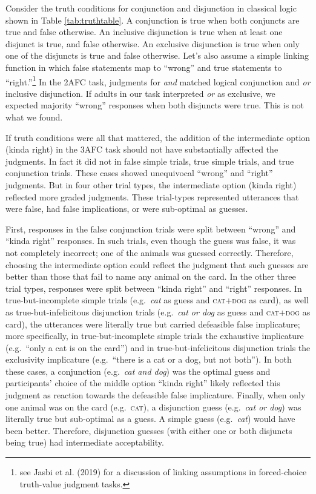 \documentclass[
  english,
  ,man,floatsintext]{apa6}
\begin{document}
Consider the truth conditions for conjunction and disjunction in classical logic shown in Table \ref{tab:truthtable}. A conjunction is true when both conjuncts are true and false otherwise. An inclusive disjunction is true when at least one disjunct is true, and false otherwise. An exclusive disjunction is true when only one of the disjuncts is true and false otherwise. Let's also assume a simple linking function in which false statements map to \enquote{wrong} and true statements to \enquote{right.}\footnote{see Jasbi et al. (2019) for a discussion of linking assumptions in forced-choice truth-value judgment tasks.} In the 2AFC task, judgments for \emph{and} matched logical conjunction and \emph{or} inclusive disjunction. If adults in our task interpreted \emph{or} as exclusive, we expected majority \enquote{wrong} responses when both disjuncts were true. This is not what we found.

If truth conditions were all that mattered, the addition of the intermediate option (kinda right) in the 3AFC task should not have substantially affected the judgments. In fact it did not in false simple trials, true simple trials, and true conjunction trials. These cases showed unequivocal \enquote{wrong} and \enquote{right} judgments. But in four other trial types, the intermediate option (kinda right) reflected more graded judgments. These trial-types represented utterances that were false, had false implications, or were sub-optimal as guesses.

First, responses in the false conjunction trials were split between \enquote{wrong} and \enquote{kinda right} responses. In such trials, even though the guess was false, it was not completely incorrect; one of the animals was guessed correctly. Therefore, choosing the intermediate option could reflect the judgment that such guesses are better than those that fail to name any animal on the card. In the other three trial types, responses were split between \enquote{kinda right} and \enquote{right} responses. In true-but-incomplete simple trials (e.g.~\emph{cat} as guess and \textsc{cat+dog} as card), as well as true-but-infelicitous disjunction trials (e.g.~\emph{cat or dog} as guess and \textsc{cat+dog} as card), the utterances were literally true but carried defeasible false implicature; more specifically, in true-but-incomplete simple trials the exhaustive implicature (e.g.~\enquote{only a cat is on the card}) and in true-but-infelicitous disjunction trials the exclusivity implicature (e.g.~\enquote{there is a cat or a dog, but not both}). In both these cases, a conjunction (e.g.~\emph{cat and dog}) was the optimal guess and participants' choice of the middle option \enquote{kinda right} likely reflected this judgment as reaction towards the defeasible false implicature. Finally, when only one animal was on the card (e.g.~\textsc{cat}), a disjunction guess (e.g.~\emph{cat or dog}) was literally true but sub-optimal as a guess. A simple guess (e.g.~\emph{cat}) would have been better. Therefore, disjunction guesses (with either one or both disjuncts being true) had intermediate acceptability.
\end{document}
